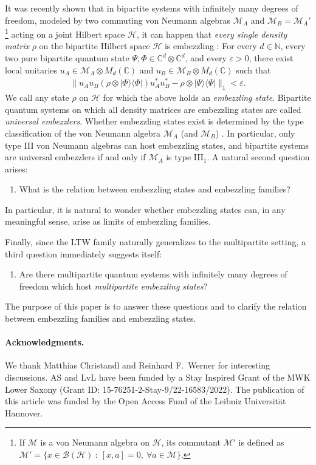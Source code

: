 \documentclass[a4paper, 10pt, onecolumn, accepted=2025-07-22]{quantumarticle}
\theoremstyle{definition}
\newcommand{\norm}[1]{\lVert #1\rVert}
\newcommand{\mc}{\mathcal}
\newcommand{\eps}{\varepsilon}
\def\B{{\mc B}}
\def\CC{{\mathbb C}}
\def\H{{\mc H}}
\def\M{{\mc M}}
\def\NN{{\mathbb N}}
\newcommand*{\1}{\text{\usefont{U}{bbold}{m}{n}1}}
\begin{document}
It was recently shown that in bipartite systems with infinitely many degrees of freedom, modeled by two commuting von Neumann algebras $\M_A$ and $\M_B=\M_A'$\footnote{If $\M$ is a von Neumann algebra on $\H$, its commutant $\M'$ is defined as $\M' = \{x\in \B(\H)\ :\ [x,a]=0,\ \forall a\in \M\}.$} acting on a joint Hilbert space $\H$, it can happen that \emph{every single density matrix} $\rho$ on the bipartite Hilbert space $\H$ is embezzling \cite{long_paper,short_paper}: For every $d\in\NN$, every two pure bipartite quantum state $\Psi,\Phi \in \CC^d\otimes \CC^d$, and every $\eps>0$, there exist local unitaries $u_A\in \M_A\otimes M_d(\CC)$ and $u_B\in \M_B\otimes  M_d(\CC)$ such that
\begin{align}
    \norm{u_A u_B(\rho \otimes |\Phi\rangle\!\langle \Phi|)u_A^* u_B^* - \rho\otimes |\Psi\rangle\!\langle\Psi|}_1 < \eps.
\end{align}
We call any state $\rho$ on $\H$ for which the above holds an \emph{embezzling state}. Bipartite quantum systems on which all density matrices are embezzling states are called \emph{universal embezzlers}. Whether embezzling states exist is determined by the type classification of the von Neumann algebra $\M_A$ (and $\M_B$) \cite{long_paper,short_paper}. In particular, only type III von Neumann algebras can host embezzling states, and bipartite systems are universal embezzlers if and only if $\M_A$ is type III$_1$. 
A natural second question arises:
\begin{enumerate}[resume] 
\item What is the relation between embezzling states and embezzling families?
\end{enumerate}
In particular, it is natural to wonder whether embezzling states can, in any meaningful sense, arise as limits of embezzling families.

Finally, since the LTW family naturally generalizes to the multipartite setting, a third question immediately suggests itself:
\begin{enumerate}[resume]
    \item Are there multipartite quantum systems with infinitely many degrees of freedom which host \emph{multipartite embezzling states}?
\end{enumerate}
The purpose of this paper is to answer these questions and to clarify the relation between embezzling families and embezzling states.


\paragraph{Acknowledgments.} We thank Matthias Christandl and Reinhard F.\ Werner for interesting discussions. AS and LvL have been funded by a Stay Inspired Grant of the MWK Lower Saxony (Grant ID: 15-76251-2-Stay-9/22-16583/2022). The publication of this article was funded by the Open Access Fund of the Leibniz Universität Hannover.
\end{document}
